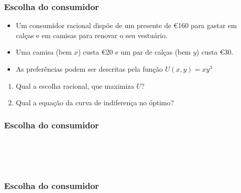 \begin{frame}
	\frametitle{Escolha do consumidor}

	\begin{itemize}
		\item Um consumidor racional disp\~oe de um presente de \euro 160 para gastar em cal\c cas e em camisas para renovar o seu vestu\'ario.
		\item Uma camisa (bem $x$) custa \euro 20 e um par de cal\c cas (bem $y$) custa \euro 30.
		\item As prefer\^encias podem ser descritas pela fun\c c\~ao $U(x,y)=xy^3$
	\end{itemize}

	\begin{enumerate}
		\item Qual a escolha racional, que maximiza $U$?
		\item Qual a equa\c c\~ao da curva de indiferen\c ca no \'optimo?
	\end{enumerate}

\end{frame}

\begin{frame}
	\frametitle{Escolha do consumidor}

	\\

	\\

	\\

	\onslide<4->{\[|TMS|=\frac{y}{3x}\]}

\end{frame}

\begin{frame}
	\frametitle{Escolha do consumidor}




\end{frame}

